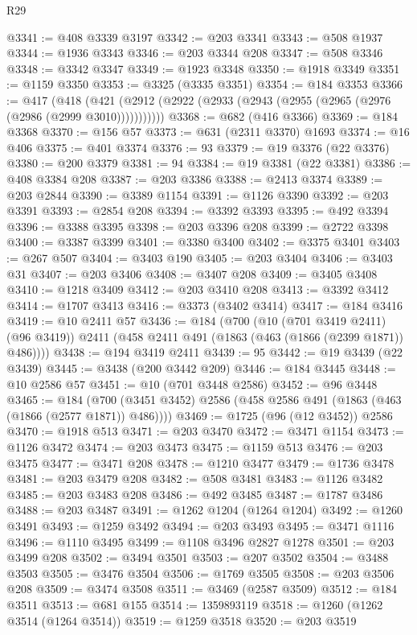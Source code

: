 \begin{lexlean}{R29}
\begin{coremodule}
@3341 := @408 @3339 @3197
@3342 := @203 @3341
@3343 := @508 @1937
@3344 := @1936 @3343
@3346 := @203 @3344 @208
@3347 := @508 @3346
@3348 := @3342 @3347
@3349 := @1923 @3348
@3350 := @1918 @3349
@3351 := @1159 @3350
@3353 := @3325 (@3335 @3351)
@3354 := @184 @3353
@3366 := @417
    (@418 (@421 (@2912 (@2922 (@2933 (@2943 (@2955 (@2965 (@2976 (@2986 (@2999 @3010)))))))))))
@3368 := @682 (@416 @3366)
@3369 := @184 @3368
@3370 := @156 @57
@3373 := @631 (@2311 @3370) @1693
@3374 := @16 @406
@3375 := @401 @3374
@3376 := 93
@3379 := @19 @3376 (@22 @3376)
@3380 := @200 @3379
@3381 := 94
@3384 := @19 @3381 (@22 @3381)
@3386 := @408 @3384 @208
@3387 := @203 @3386
@3388 := @2413 @3374
@3389 := @203 @2844
@3390 := @3389 @1154
@3391 := @1126 @3390
@3392 := @203 @3391
@3393 := @2854 @208
@3394 := @3392 @3393
@3395 := @492 @3394
@3396 := @3388 @3395
@3398 := @203 @3396 @208
@3399 := @2722 @3398
@3400 := @3387 @3399
@3401 := @3380 @3400
@3402 := @3375 @3401
@3403 := @267 @507
@3404 := @3403 @190
@3405 := @203 @3404
@3406 := @3403 @31
@3407 := @203 @3406
@3408 := @3407 @208
@3409 := @3405 @3408
@3410 := @1218 @3409
@3412 := @203 @3410 @208
@3413 := @3392 @3412
@3414 := @1707 @3413
@3416 := @3373 (@3402 @3414)
@3417 := @184 @3416
@3419 := @10 @2411 @57
@3436 := @184
    (@700
      (@10 (@701 @3419 @2411) (@96 @3419))
      @2411
      (@458 @2411 @491 (@1863 (@463 (@1866 (@2399 @1871)) @486))))
@3438 := @194 @3419 @2411
@3439 := 95
@3442 := @19 @3439 (@22 @3439)
@3445 := @3438 (@200 @3442 @209)
@3446 := @184 @3445
@3448 := @10 @2586 @57
@3451 := @10 (@701 @3448 @2586)
@3452 := @96 @3448
@3465 := @184 (@700 (@3451 @3452) @2586 (@458 @2586 @491 (@1863 (@463 (@1866 (@2577 @1871)) @486))))
@3469 := @1725 (@96 (@12 @3452)) @2586
@3470 := @1918 @513
@3471 := @203 @3470
@3472 := @3471 @1154
@3473 := @1126 @3472
@3474 := @203 @3473
@3475 := @1159 @513
@3476 := @203 @3475
@3477 := @3471 @208
@3478 := @1210 @3477
@3479 := @1736 @3478
@3481 := @203 @3479 @208
@3482 := @508 @3481
@3483 := @1126 @3482
@3485 := @203 @3483 @208
@3486 := @492 @3485
@3487 := @1787 @3486
@3488 := @203 @3487
@3491 := @1262 @1204 (@1264 @1204)
@3492 := @1260 @3491
@3493 := @1259 @3492
@3494 := @203 @3493
@3495 := @3471 @1116
@3496 := @1110 @3495
@3499 := @1108 @3496 @2827 @1278
@3501 := @203 @3499 @208
@3502 := @3494 @3501
@3503 := @207 @3502
@3504 := @3488 @3503
@3505 := @3476 @3504
@3506 := @1769 @3505
@3508 := @203 @3506 @208
@3509 := @3474 @3508
@3511 := @3469 (@2587 @3509)
@3512 := @184 @3511
@3513 := @681 @155
@3514 := 1359893119
@3518 := @1260 (@1262 @3514 (@1264 @3514))
@3519 := @1259 @3518
@3520 := @203 @3519

\end{coremodule}
\end{lexlean}
